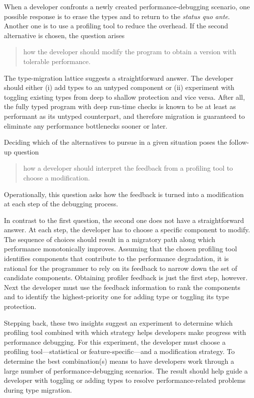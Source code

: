 
When a developer confronts a newly created performance-debugging scenario, one
possible response is to erase the types and to return to the {\em status quo
ante\/}.  Another one is to use a profiling tool to reduce the overhead. If the
second alternative is chosen, the question arises 
\begin{quote} \em

 how the developer should modify the program to obtain a version with tolerable
 performance.
 
\end{quote}   
The type-migration lattice suggests a straightforward answer.  The developer
should either (i) add types to an untyped component or (ii) experiment with
toggling existing types from deep to shallow protection and vice versa.  After
all, the fully typed program with deep run-time checks is known to be at least
as performant as its untyped counterpart, and therefore migration is guaranteed
to eliminate any performance bottlenecks sooner or later. 

Deciding which of the alternatives to pursue in a given situation poses the
follow-up question 
\begin{quote} \em

how a developer should interpret the feedback from a profiling tool to
choose a modification.

\end{quote}   
Operationally, this question asks how the feedback is turned into a
modification at each step of the debugging process.

In contrast to the first question, the second one does not have a
straightforward answer.  At each step, the developer has to choose a specific
component to modify.  The sequence of choices should result in a migratory path
along which performance monotonically improves. Assuming that the chosen
profiling tool identifies components that contribute to the performance
degradation, it is rational for the programmer to rely on its feedback to narrow
down the set of candidate components.  Obtaining profiler feedback is just the
first step, however. Next the developer must use the feedback information to
rank the components and to identify the highest-priority one for adding type or
toggling its type protection. 

Stepping back, these two insights suggest an experiment to determine which
profiling tool combined with which strategy helps developers make progress with
performance debugging. For this experiment, the developer must choose a
profiling tool---statistical or feature-specific---and a modification strategy.
To determine the best combination(s) means to have developers work through a
large number of performance-debugging scenarios. The result should help guide a
developer with toggling or adding types to resolve performance-related
problems during type migration.

